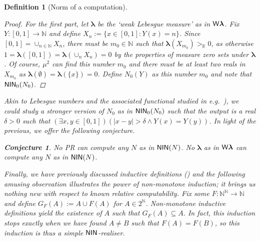 \documentclass[reqno]{amsart}
\newtheorem{defi}[thm]{Definition}
\newtheorem{conj}[thm]{Conjecture}
\def\N{{\mathbb  N}}
\def\R{{\mathbb  R}}
\def\di{\rightarrow}
\def\WL{\textup{\textsf{W}}{\mathbold\lambda}}
\def\NIN{\textup{\textsf{NIN}}}
\def\blambda{\pmb{\lambda}}
\numberwithin{equation}{section}
\numberwithin{thm}{section}
\begin{document}
\begin{defi}[Norm of a computation]
\begin{proof}
\smallskip

For the first part, let $\blambda$ be the `weak Lebesgue measure' as in $\WL$.  Fix $Y:[0,1]\di \N$ and define $X_{n}:= \{ x\in [0,1]:Y(x)=n  \}$.  
Since $[0,1]=\cup_{n\in \N}X_{n}$, there must be $m_{0}\in \N$ such that $\blambda(X_{m_{0}})>_{\R}0$, as otherwise $1=\blambda([0,1])=\blambda(\cup_{n}X_{n})=0$ by the properties of 
measure zero sets under $\blambda$.    
Of course, $\mu^{2}$ can find this number $m_{0}$ and there must be at least two reals in $X_{m_{0}}$ as $\blambda(\emptyset)=\blambda(\{x\})=0$.  
Define $N_{0}(Y)$ as this number $m_{0}$ and note that $\NIN_{0}(N_{0})$.
\end{proof}
Akin to \emph{Lebesgue numbers} and the associated functional studied in e.g.\ \cite{dagsamIX}), we could study a stronger version of $N_{0}$ as in $\NIN_{0}(N_{0})$ such that the output 
is a real $\delta>0$ such that $(\exists x, y\in [0,1])(|x-y|>\delta\wedge Y(x)=Y(y))$. 
In light of the previous, we offer the following conjecture. 
\begin{conj}
No PR can compute any $N$ as in $\NIN(N)$.  No $\blambda$ as in $\WL$ can compute any $N$ as in $\NIN(N)$.
\end{conj}
Finally, we have previously discussed inductive definitions (\cite{dagcie18, dagsamVII}) and 
the following amusing observation illustrates the power of non-monotone induction; it brings us nothing new with respect to known relative computability.
Fix some $F:\N^{\N}\di \N$ and define $G_F(A) := A \cup {F(A)}$ for $A\in 2^{\N}$.  Non-monotone inductive definitions yield the existence of $A$ such that $G_{F}(A)\subseteq A$.  
In fact, this induction stops exactly when we have found $A \ne B$ such that $F(A) = F(B)$, so this induction is thus a simple $\NIN$-realiser.


\appendix

\end{defi}
\end{document}
